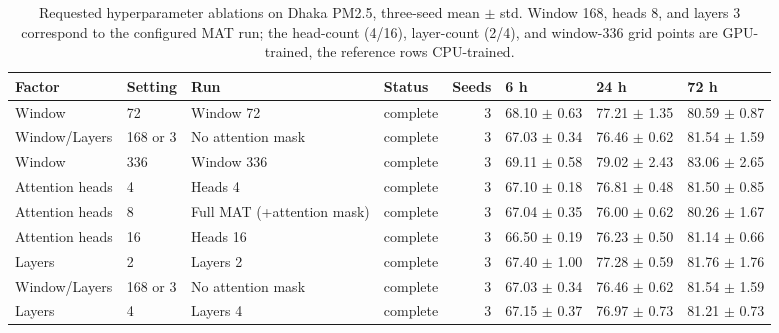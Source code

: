 \begin{table}
\caption{Requested hyperparameter ablations on Dhaka PM2.5, three-seed mean $\pm$ std. Window 168, heads 8, and layers 3 correspond to the configured MAT run; the head-count (4/16), layer-count (2/4), and window-336 grid points are GPU-trained, the reference rows CPU-trained.}
\label{tab:requested_hparam_ablations}
\begin{tabular}{llllrlll}
\toprule
Factor & Setting & Run & Status & Seeds & 6 h & 24 h & 72 h \\
\midrule
Window & 72 & Window 72 & complete & 3 & 68.10 $\pm$ 0.63 & 77.21 $\pm$ 1.35 & 80.59 $\pm$ 0.87 \\
Window/Layers & 168 or 3 & No attention mask & complete & 3 & 67.03 $\pm$ 0.34 & 76.46 $\pm$ 0.62 & 81.54 $\pm$ 1.59 \\
Window & 336 & Window 336 & complete & 3 & 69.11 $\pm$ 0.58 & 79.02 $\pm$ 2.43 & 83.06 $\pm$ 2.65 \\
Attention heads & 4 & Heads 4 & complete & 3 & 67.10 $\pm$ 0.18 & 76.81 $\pm$ 0.48 & 81.50 $\pm$ 0.85 \\
Attention heads & 8 & Full MAT (+attention mask) & complete & 3 & 67.04 $\pm$ 0.35 & 76.00 $\pm$ 0.62 & 80.26 $\pm$ 1.67 \\
Attention heads & 16 & Heads 16 & complete & 3 & 66.50 $\pm$ 0.19 & 76.23 $\pm$ 0.50 & 81.14 $\pm$ 0.66 \\
Layers & 2 & Layers 2 & complete & 3 & 67.40 $\pm$ 1.00 & 77.28 $\pm$ 0.59 & 81.76 $\pm$ 1.76 \\
Window/Layers & 168 or 3 & No attention mask & complete & 3 & 67.03 $\pm$ 0.34 & 76.46 $\pm$ 0.62 & 81.54 $\pm$ 1.59 \\
Layers & 4 & Layers 4 & complete & 3 & 67.15 $\pm$ 0.37 & 76.97 $\pm$ 0.73 & 81.21 $\pm$ 0.73 \\
\bottomrule
\end{tabular}
\end{table}
